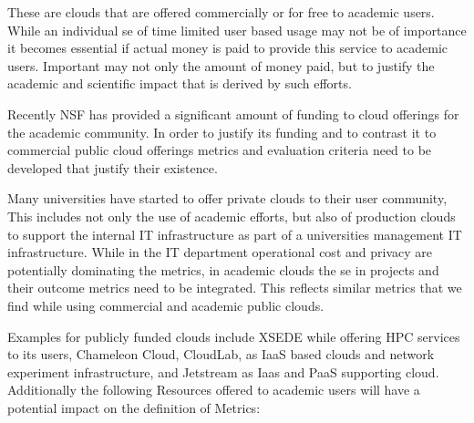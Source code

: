\documentclass{sig-alternate-05-2015}
\begin{document}
\begin{description}
\setlength\itemsep{-2pt}

\item[\it Commercial public clouds.] These are clouds that are offered
  commercially or for free to academic users. While an individual se
  of time limited user based usage may not be of importance it becomes
  essential if actual money is paid to provide this service to
  academic users. Important may not only the amount of money paid, but
  to justify the academic and scientific impact
  \cite{las2015cluster,las2015xsede} that is derived by such efforts.

\item[\it Academic public clouds.] Recently NSF has provided a significant
  amount of funding to cloud offerings for the academic community. In
  order to justify its funding and to contrast it to commercial public
  cloud offerings metrics and evaluation criteria need to be
  developed that justify their existence. 

\item[\it Academic private clouds.] Many universities have started to
  offer private clouds to their user community, This includes not only
  the use of academic efforts, but also of production clouds to support
  the internal IT infrastructure as part of a universities management
  IT infrastructure. While in the IT department operational cost and
  privacy are potentially dominating the metrics, in academic clouds
  the se in projects and their outcome metrics need to be
  integrated. This reflects similar metrics that we find while using
  commercial and academic public clouds.

\end{description}

Examples for publicly funded clouds include XSEDE while offering HPC
services to its users, Chameleon Cloud, CloudLab, as IaaS based clouds
and network experiment infrastructure, and Jetstream as Iaas and PaaS
supporting cloud. Additionally the following Resources offered to
academic users will have a potential impact on the definition of Metrics:
\end{document}
